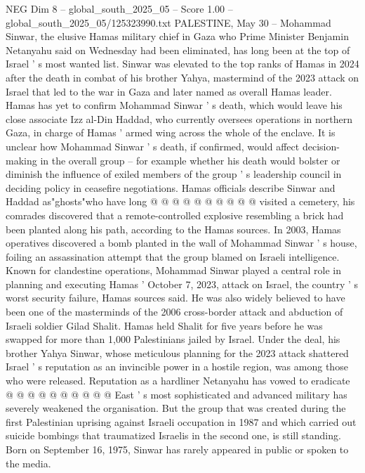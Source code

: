 \begin{textsample}{NEG Dim 8 – global\_south\_2025\_05 – Score 1.00 – global\_south\_2025\_05/125323990.txt}  \label{ex:f8_neg_317}
PALESTINE, May 30 -- Mohammad Sinwar, the elusive Hamas military chief in Gaza who Prime Minister Benjamin Netanyahu said on Wednesday had been eliminated, has long been at the top of Israel ' s most wanted list.
Sinwar was elevated to the top ranks of Hamas in 2024 after the death in combat of his brother Yahya, mastermind of the 2023 attack on Israel that led to the war in Gaza and later named as overall Hamas leader.
Hamas has yet to confirm Mohammad Sinwar ' s death, which would leave his close associate Izz al-Din Haddad, who currently oversees operations in northern Gaza, in charge of Hamas ' armed wing across the whole of the enclave.
It is unclear how Mohammad Sinwar ' s death, if confirmed, would affect decision-making in the overall group -- for example whether his death would bolster or diminish the influence of exiled members of the group ' s leadership council in deciding policy in ceasefire negotiations.
Hamas officials describe Sinwar and Haddad as"ghosts"who have long @ @ @ @ @ @ @ @ @ @ visited a cemetery, his comrades discovered that a remote-controlled explosive resembling a brick had been planted along his path, according to the Hamas sources.
In 2003, Hamas operatives discovered a bomb planted in the wall of Mohammad Sinwar ' s house, foiling an assassination attempt that the group blamed on Israeli intelligence.
Known for clandestine operations, Mohammad Sinwar played a central role in planning and executing Hamas ' October 7, 2023, attack on Israel, the country ' s worst security failure, Hamas sources said.
He was also widely believed to have been one of the masterminds of the 2006 cross-border attack and abduction of Israeli soldier Gilad Shalit.
Hamas held Shalit for five years before he was swapped for more than 1,000 Palestinians jailed by Israel.
Under the deal, his brother Yahya Sinwar, whose meticulous planning for the 2023 attack shattered Israel ' s reputation as an invincible power in a hostile region, was among those who were released.
Reputation as a hardliner Netanyahu has vowed to eradicate @ @ @ @ @ @ @ @ @ @ East ' s most sophisticated and advanced military has severely weakened the organisation.
But the group that was created during the first Palestinian uprising against Israeli occupation in 1987 and which carried out suicide bombings that traumatized Israelis in the second one, is still standing.
Born on September 16, 1975, Sinwar has rarely appeared in public or spoken to the media.

\end{textsample}
